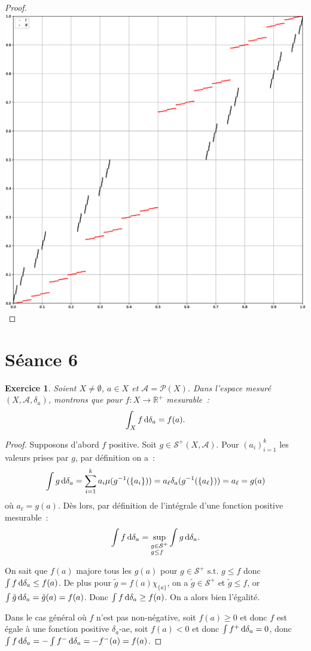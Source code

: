\documentclass{article}
\newtheorem{ex}{Exercice}[section]
\newcommand{\st}{\text{ s.t. }}
\newcommand{\R}{{\mathbb R}}
\begin{document}
\begin{proof}
\includegraphics[width=\textwidth]{cantor.eps}
\end{proof}

\newpage
\section{Séance 6}

\begin{ex} Soient $X \neq \emptyset$, $a \in X$ et $\mathcal A = \mathcal P(X)$. Dans l'espace mesuré $(X, \mathcal A, \delta_a)$, montrons que pour $f : X \to \R^+$ mesurable~:
\[\int_X f\dif\delta_a = f(a).\]
\end{ex}

\begin{proof} Supposons d'abord $f$ positive. Soit $g \in \mathcal S^+(X, \mathcal A)$. Pour $(a_i)_{i=1}^k$ les valeurs prises par $g$, par définition on a~:
\[\int g\dif\delta_a = \sum_{i=1}^ka_i\mu(g^{-1}(\{a_i\})) = a_\ell\delta_a(g^{-1}(\{a_\ell\})) = a_\ell = g(a)\]
où $a_\ell = g(a)$. Dès lors, par définition de l'intégrale d'une fonction positive mesurable~:
\[\int f\dif\delta_a = \sup_{\begin{subarray}{l} g \in \mathcal S^+ \\ g \leq f \end{subarray}}\int g\dif\delta_a.\]

On sait que $f(a)$ majore tous les $g(a)$ pour $g \in \mathcal S^+ \st g \leq f$ donc $\int f\dif\delta_a \leq f(a)$. De plus pour $\tilde g = f(a)\chi_{\{a\}}$, on a
$\tilde g \in \mathcal S^+$ et $\tilde g \leq f$, or $\int \tilde g\dif\delta_a = \tilde g(a) = f(a)$. Donc $\int f\dif\delta_a \geq f(a)$. On a alors bien l'égalité.

Dans le cas général où $f$ n'est pas non-négative, soit $f(a) \geq 0$ et donc $f$ est égale à une fonction positive $\delta_a$-ae, soit $f(a) < 0$ et donc $\int f^+\dif\delta_a = 0$,
donc $\int f\dif\delta_a = -\int f^-\dif\delta_a = -f^-(a) = f(a)$.
\end{proof}
\end{document}
